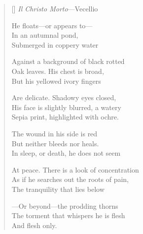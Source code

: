 \label{ch:venezia_scuola}
\settowidth{\versewidth}{At peace. There is a look of concentration}
\begin{verse}[\versewidth]
\textit{Il Christo Morto}---Vecellio

He floats---or appears to---\\
In an autumnal pond,\\
Submerged in coppery water

Against a background of black rotted\\
Oak leaves.   His chest is broad,\\
But his yellowed ivory fingers

Are delicate.  Shadowy eyes closed,\\
His face is slightly blurred, a watery\\
Sepia print, highlighted with ochre.

The wound in his side is red\\
But neither bleeds nor heals.\\
In sleep, or death, he does not seem

At peace. There is a look of concentration\\
As if he searches out the roots of pain,\\
The tranquility that lies below

---Or beyond---the prodding thorns\\
The torment that whispers he is flesh\\
And flesh only.
\end{verse}
